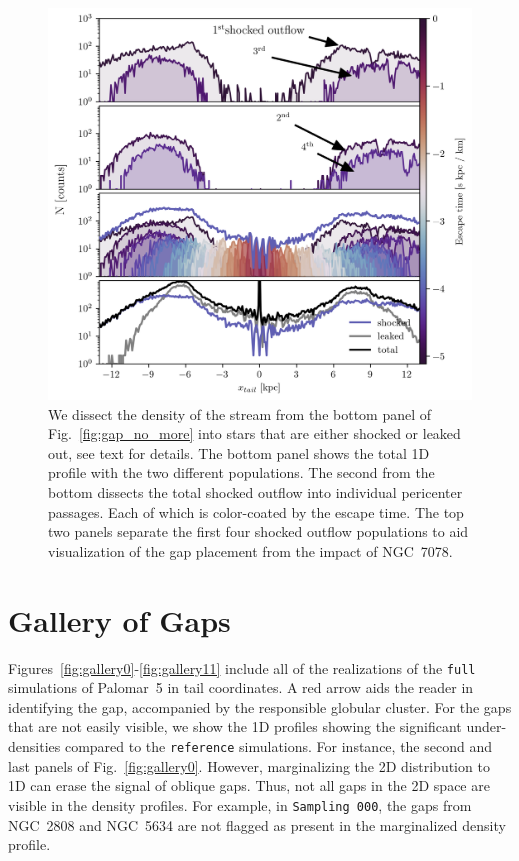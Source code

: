 \documentclass{aa}
\begin{document}
\begin{appendix}
\begin{figure}
    \includegraphics[width=\linewidth]{decoherence_shocked_outflow.png}
    \caption{We dissect the density of the stream from the bottom panel of Fig.~\ref{fig:gap_no_more} into stars that are either shocked or leaked out, see text for details. The bottom panel shows the total 1D profile with the two different populations. The second from the bottom dissects the total shocked outflow into individual pericenter passages. Each of which is color-coated by the escape time. The top two panels separate the first four shocked outflow populations to aid visualization of the gap placement from the impact of NGC~7078. }
    \label{fig:decoherence_shocked_outflow}
\end{figure}



  \section{Gallery of Gaps} \label{sec:gallery_of_gaps}
    Figures~\ref{fig:gallery0}-\ref{fig:gallery11} include all of the realizations of the \texttt{full} simulations of Palomar~5 in tail coordinates. A red arrow aids the reader in identifying the gap, accompanied by the responsible globular cluster. For the gaps that are not easily visible, we show the 1D profiles showing the significant under-densities compared to the \texttt{reference} simulations. For instance, the second and last panels of Fig.~\ref{fig:gallery0}. However, marginalizing the 2D distribution to 1D can erase the signal of oblique gaps. Thus, not all gaps in the 2D space are visible in the density profiles. For example, in \texttt{Sampling 000}, the gaps from NGC~2808 and NGC~5634 are not flagged as present in the marginalized density profile.


\end{appendix}
\end{document}

